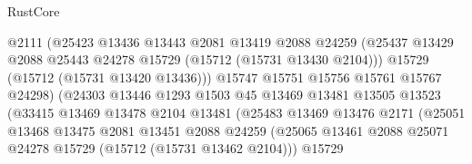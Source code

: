 \begin{lexlean}{RustCore}
\begin{coremodule}
                                    @2111
                                    (@25423
                                      @13436
                                      @13443
                                      @2081
                                      @13419
                                      @2088
                                      @24259
                                      (@25437
                                        @13429
                                        @2088
                                        @25443
                                        @24278
                                        @15729
                                        (@15712 (@15731 @13430 @2104)))
                                      @15729
                                      (@15712 (@15731 @13420 @13436)))
                                    @15747
                                    @15751
                                    @15756
                                    @15761
                                    @15767
                                    @24298)
                                  (@24303
                                    @13446
                                    @1293
                                    @1503
                                    @45
                                    @13469
                                    @13481
                                    @13505
                                    @13523
                                    (@33415
                                      @13469
                                      @13478
                                      @2104
                                      @13481
                                      (@25483
                                        @13469
                                        @13476
                                        @2171
                                        (@25051
                                          @13468
                                          @13475
                                          @2081
                                          @13451
                                          @2088
                                          @24259
                                          (@25065
                                            @13461
                                            @2088
                                            @25071
                                            @24278
                                            @15729
                                            (@15712 (@15731 @13462 @2104)))
                                          @15729

\end{coremodule}
\end{lexlean}

